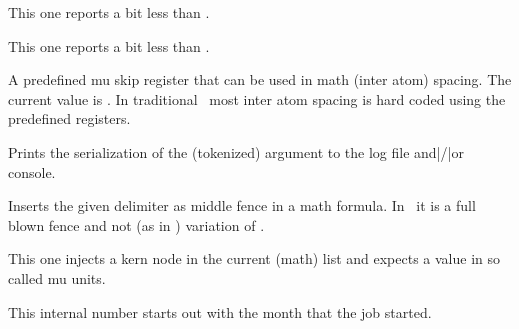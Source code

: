 \typebuffer \getbuffer

\stopnewprimitive

\startnewprimitive[title={\prm {meaningles}}]

This one reports a bit less than .

\startbuffer
\tolerant\permanent\protected\gdef\foo[#1]#*[#2]{(#1)(#2)} \meaningles\foo
\stopbuffer

\typebuffer \getbuffer

\stopnewprimitive

\startnewprimitive[title={\prm {meaningless}}]

This one reports a bit less than .

\startbuffer
\tolerant\permanent\protected\gdef\foo[#1]#*[#2]{(#1)(#2)} \meaningless\foo
\stopbuffer

\typebuffer \getbuffer

\stopnewprimitive

\startoldprimitive[title={\prm {medmuskip}}]

A predefined mu skip register that can be used in math (inter atom) spacing. The
current value is {\tt \the\medmuskip}. In traditional \TEX\ most inter atom
spacing is hard coded using the predefined registers.

\stopoldprimitive

\startoldprimitive[title={\prm {message}}]

Prints the serialization of the (tokenized) argument to the log file and|/|or
console.

\stopoldprimitive

\startoldprimitive[title={\prm {middle}}]

Inserts the given delimiter as middle fence in a math formula. In \LUAMETATEX\ it
is a full blown fence and not (as in \ETEX) variation of .

\stopoldprimitive

\startoldprimitive[title={\prm {mkern}}]

This one injects a kern node in the current (math) list and expects a value in so
called mu units.

\stopoldprimitive

\startoldprimitive[title={\prm {month}}]

This internal number starts out with the month that the job started.

\stopoldprimitive

\startoldprimitive[title={\prm {moveleft}}]

